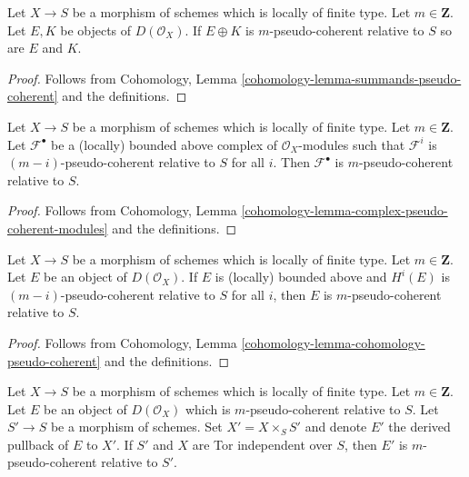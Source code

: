 \begin{lemma}
\label{lemma-summands-relative-pseudo-coherent}
Let $X \to S$ be a morphism of schemes which is locally of finite type.
Let $m \in \mathbf{Z}$. Let $E, K$ be objects of $D(\mathcal{O}_X)$.
If $E \oplus K$ is $m$-pseudo-coherent relative to $S$ so are $E$ and $K$.
\end{lemma}

\begin{proof}
Follows from
Cohomology, Lemma \ref{cohomology-lemma-summands-pseudo-coherent}
and the definitions.
\end{proof}

\begin{lemma}
\label{lemma-complex-relative-pseudo-coherent-modules}
Let $X \to S$ be a morphism of schemes which is locally of finite type.
Let $m \in \mathbf{Z}$. Let $\mathcal{F}^\bullet$ be a (locally) bounded
above complex of $\mathcal{O}_X$-modules such that $\mathcal{F}^i$ is
$(m - i)$-pseudo-coherent relative to $S$ for all $i$. Then
$\mathcal{F}^\bullet$ is $m$-pseudo-coherent relative to $S$.
\end{lemma}

\begin{proof}
Follows from
Cohomology, Lemma \ref{cohomology-lemma-complex-pseudo-coherent-modules}
and the definitions.
\end{proof}

\begin{lemma}
\label{lemma-cohomology-relative-pseudo-coherent}
Let $X \to S$ be a morphism of schemes which is locally of finite type.
Let $m \in \mathbf{Z}$. Let $E$ be an object of $D(\mathcal{O}_X)$.
If $E$ is (locally) bounded above and $H^i(E)$ is $(m - i)$-pseudo-coherent
relative to $S$ for all $i$, then $E$ is $m$-pseudo-coherent relative to $S$.
\end{lemma}

\begin{proof}
Follows from
Cohomology, Lemma \ref{cohomology-lemma-cohomology-pseudo-coherent}
and the definitions.
\end{proof}

\begin{lemma}
\label{lemma-base-change-relative-pseudo-coherent}
Let $X \to S$ be a morphism of schemes which is locally of finite type.
Let $m \in \mathbf{Z}$. Let $E$ be an object of $D(\mathcal{O}_X)$
which is $m$-pseudo-coherent relative to $S$. Let $S' \to S$ be a
morphism of schemes. Set $X' = X \times_S S'$ and denote $E'$
the derived pullback of $E$ to $X'$. If $S'$ and $X$ are
Tor independent over $S$, then $E'$
is $m$-pseudo-coherent relative to $S'$.
\end{lemma}

